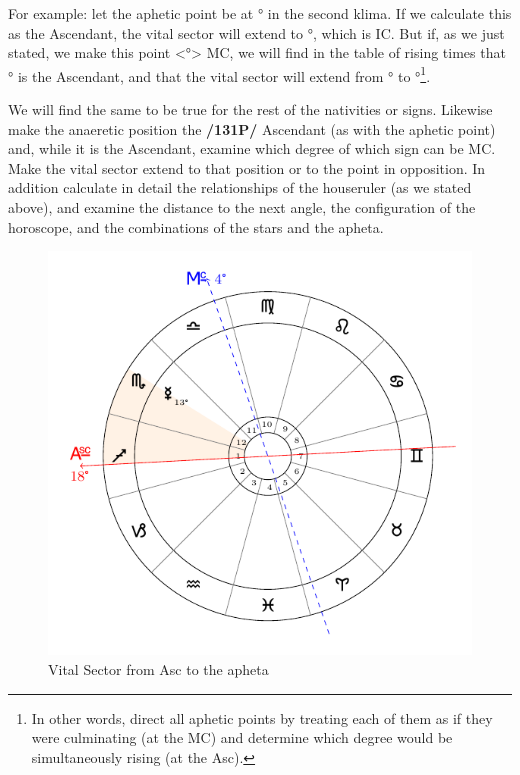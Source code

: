 For example: let the aphetic point be at \Scorpio\xspace 12° in the second klima. If we calculate this as the Ascendant, the vital sector will extend to \Aquarius\xspace 13°, which is IC. But if, as we just stated, we make this point <\Scorpio\xspace 12°> MC, we will find in the table of rising times that \Capricorn\xspace 28° is the Ascendant, and that the vital sector will extend from \Scorpio\xspace 12° to \Capricorn\xspace 28°\footnote{In other words, direct all aphetic points by treating each of them as if they were culminating (at the MC) and determine which degree would be simultaneously rising (at the Asc).}. 

We will find the same to be true for the rest of the nativities or signs. Likewise make the anaeretic position the \textbf{/131P/} Ascendant (as with the aphetic point) and, while it is
the Ascendant, examine which degree of which sign can be MC. Make the vital sector extend to that position or to the point in opposition. In addition calculate in detail the relationships of the houseruler (as we stated above), and examine the distance to the next angle, the configuration of the horoscope, and the combinations of the stars and the apheta.

\begin{figure}[H]
\centering
\includegraphics[width=.7\textwidth]{charts/3_03_2}
\caption{Vital Sector from Asc to the apheta}
\end{figure}

